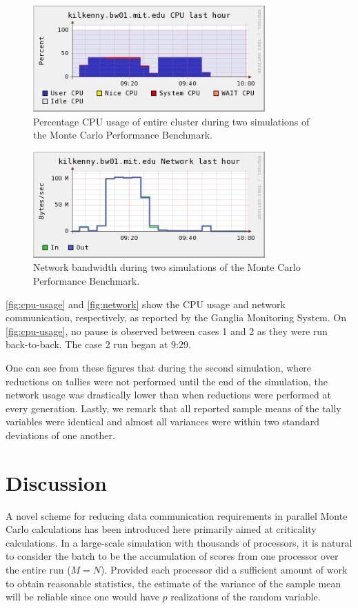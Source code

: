\begin{figure}[ht]
  \centering
  \includegraphics[width=3.5in]{figures/ch4/cpu_usage.png}
  \caption{Percentage CPU usage of entire cluster during two simulations of the
    Monte Carlo Performance Benchmark.}
  \label{fig:cpu-usage}
\end{figure}
\begin{figure}[ht]
  \centering
  \includegraphics[width=3.5in]{figures/ch4/network.png}
  \caption{Network bandwidth during two simulations of the Monte Carlo
    Performance Benchmark.}
  \label{fig:network}
\end{figure}
\autoref{fig:cpu-usage} and \autoref{fig:network} show the CPU usage and network
communication, respectively, as reported by the Ganglia Monitoring System. On
\autoref{fig:cpu-usage}, no pause is observed between cases 1 and 2 as they were
run back-to-back. The case 2 run began at 9:29.

One can see from these figures that during the second simulation, where
reductions on tallies were not performed until the end of the simulation, the
network usage was drastically lower than when reductions were performed at every
generation. Lastly, we remark that all reported sample means of the tally
variables were identical and almost all variances were within two standard
deviations of one another.

\section{Discussion}

A novel scheme for reducing data communication requirements in parallel Monte
Carlo calculations has been introduced here primarily aimed at criticality
calculations. In a large-scale simulation with thousands of processors, it is
natural to consider the batch to be the accumulation of scores from one
processor over the entire run ($M = N$). Provided each processor did a
sufficient amount of work to obtain reasonable statistics, the estimate of the
variance of the sample mean will be reliable since one would have $p$
realizations of the random variable.

